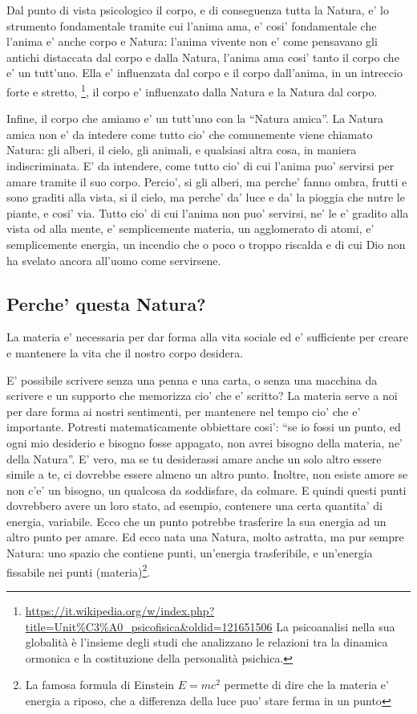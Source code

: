 Dal punto di vista psicologico il corpo, e di conseguenza tutta la Natura, e' lo strumento fondamentale tramite cui l'anima ama, e' cosi' fondamentale che l'anima e' anche corpo e Natura: l'anima vivente non e' come pensavano gli antichi distaccata dal corpo e dalla Natura, l'anima ama cosi' tanto il corpo che e' un tutt'uno. Ella e' influenzata dal corpo e il corpo dall'anima, in un intreccio forte e stretto, \footnote{
    \url{https://it.wikipedia.org/w/index.php?title=Unit\%C3\%A0\_psicofisica&oldid=121651506}
    La psicoanalisi nella sua globalità è l'insieme degli studi che analizzano le relazioni tra la dinamica ormonica e la costituzione della personalità psichica. 
}, il corpo e' influenzato dalla Natura e la Natura dal corpo.

Infine, il corpo che amiamo e' un tutt'uno con la ``Natura amica''.
La Natura amica non e' da intedere come tutto cio' che comunemente viene chiamato Natura: gli alberi, il cielo, gli animali, e qualsiasi altra cosa, in maniera indiscriminata. E' da intendere, come tutto cio' di cui l'anima puo' servirsi per amare tramite il suo corpo. Percio', si gli alberi, ma perche' fanno ombra, frutti e sono graditi alla vista, si il cielo, ma perche' da' luce e da' la pioggia che nutre le piante, e cosi' via. Tutto cio' di cui l'anima non puo' servirsi, ne' le e' gradito alla vista od alla mente, e' semplicemente materia, un agglomerato di atomi, e' semplicemente energia, un incendio che o poco o troppo riscalda e di cui Dio non ha svelato ancora all'uomo come servirsene.


\subsection{Perche' questa Natura?}
La materia e' necessaria per dar forma alla vita sociale ed e' sufficiente per creare e mantenere la vita che il nostro corpo desidera.

E' possibile scrivere senza una penna e una carta, o senza una macchina da scrivere e un supporto che memorizza cio' che e' scritto? 
La materia serve a noi per dare forma ai nostri sentimenti, per mantenere nel tempo cio' che e' importante. Potresti matematicamente obbiettare cosi': ``se io fossi un punto, ed ogni mio desiderio e bisogno fosse appagato, non avrei bisogno della materia, ne' della Natura''. E' vero, ma se tu desiderassi amare anche un solo altro essere simile a te, ci dovrebbe essere almeno un altro punto. Inoltre, non esiste amore se non c'e' un bisogno, un qualcosa da soddisfare, da colmare. E quindi questi punti dovrebbero avere un loro stato, ad esempio, contenere una certa quantita' di energia, variabile. Ecco che un punto potrebbe trasferire la sua energia ad un altro punto per amare. Ed ecco nata una Natura, molto astratta, ma pur sempre Natura: uno spazio che contiene punti, un'energia trasferibile, e un'energia fissabile nei punti (materia)\footnote{La famosa formula di Einstein $E=mc^2$ permette di dire che la materia e' energia a riposo, che a differenza della luce puo' stare ferma in un punto}.

